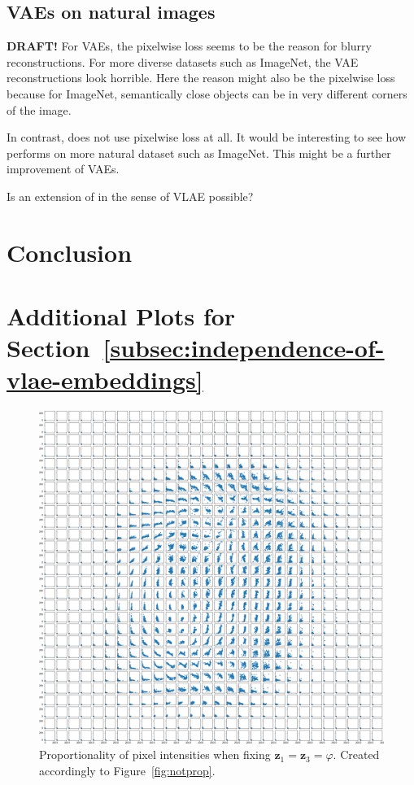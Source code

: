 \documentclass[11pt]{article}
\begin{document}
\subsection{\acp{VAE} on natural images}
\textbf{DRAFT!}
For \acp{VAE}, the pixelwise loss seems to be the reason for blurry reconstructions.
For more diverse datasets such as ImageNet, the VAE reconstructions look horrible.
Here the reason might also be the pixelwise loss because for ImageNet, semantically close objects can be in very different corners of the image.

In contrast, \citet{pidhorskyi2020adversarial} does not use pixelwise loss at all.
It would be interesting to see how \citet{pidhorskyi2020adversarial} performs on more natural dataset such as ImageNet.
This might be a further improvement of \acp{VAE}.

Is an extension of \citet{pidhorskyi2020adversarial} in the sense of VLAE possible?

\section{Conclusion}\label{sec:conclusion}

\newpage
\printbibliography

\newpage
\appendix
\section{Additional Plots for Section~\ref{subsec:independence-of-vlae-embeddings}}\label{sec:additional-plots-for-section_independence}
\begin{figure}[H]
\centering
\includegraphics[width=\textwidth]{images/appendix_plots/notprop_1_3.png}
\caption{Proportionality of pixel intensities when fixing $\bm{z}_1 = \bm{z}_3=\varphi$. Created accordingly to Figure~\ref{fig:notprop}.}
\label{fig:notprop_1_3}
\end{figure}
\end{document}
